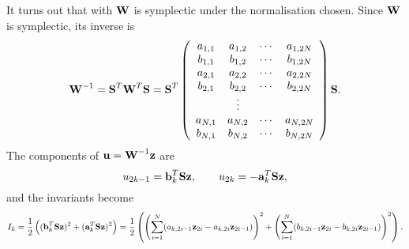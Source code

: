 It turns out that with $\bold{W}$ is symplectic under the
normalisation chosen.
Since $\bold{W}$ is symplectic, its inverse is
\begin{equation}
\bold{W}^{-1} = \bold{S}^T \bold{W}^T \bold{S} =
\bold{S}^T \left( \begin{array}{cccc}
a_{1,1} & a_{1,2} & \cdots & a_{1,2N} \\
b_{1,1} & b_{1,2} & \cdots & b_{1,2N} \\
a_{2,1} & a_{2,2} & \cdots & a_{2,2N} \\
b_{2,1} & b_{2,2} & \cdots & b_{2,2N} \\
        & \vdots &          \\
a_{N,1} & a_{N,2} & \cdots & a_{N,2N} \\
b_{N,1} & b_{N,2} & \cdots & b_{N,2N}
\end{array} \right) \bold{S}.
\end{equation}
The components of $\bold{u} = \bold{W}^{-1} \bold{z}$ are
\begin{equation}
u_{2k-1} = \bold{b}_k^T \bold{S} \bold{z}, \qquad
u_{2k} = - \bold{a}_k^T \bold{S} \bold{z},
\end{equation}
and the invariants become
\begin{equation}
I_k =
\frac{1}{2} \left(
        (\bold{b}_k^T \bold{S} \bold{z})^2 +
        (\bold{a}_k^T \bold{S} \bold{z})^2
\right) = \frac{1}{2} \left(
        \left(\sum_{i=1}^N (a_{k,2i-1} \bold{z}_{2i} -
                a_{k,2i} \bold{z}_{2i-1})\right)^2 +
        \left(\sum_{i=1}^N (b_{k,2i-1} \bold{z}_{2i} -
                b_{k,2i} \bold{z}_{2i-1})\right)^2
\right).
\end{equation} 
 
 
